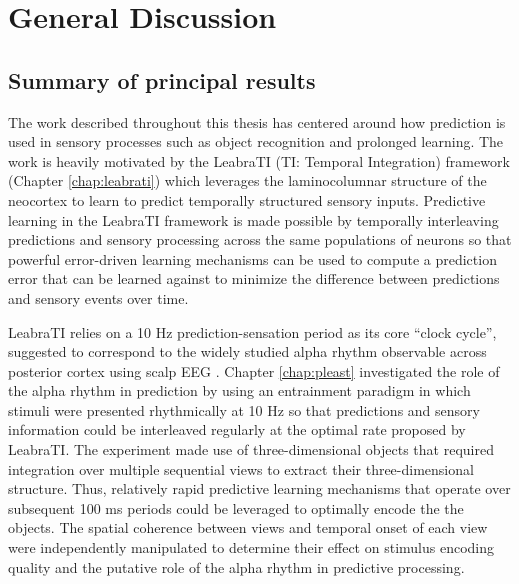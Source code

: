 \documentclass[dwyatte_dissertation.tex]{subfiles}
\begin{document}
\sloppy

\chapter{General Discussion}
\section{Summary of principal results}
The work described throughout this thesis has centered around how prediction is used in sensory processes such as object recognition and prolonged learning. The work is heavily motivated by the LeabraTI (TI: Temporal Integration) framework (Chapter \ref{chap:leabrati}) which leverages the laminocolumnar structure of the neocortex \cite{Mountcastle97,BuxhoevedenCasanova02,HortonAdams05} to learn to predict temporally structured sensory inputs. Predictive learning in the LeabraTI framework is made possible by temporally interleaving predictions and sensory processing across the same populations of neurons so that powerful error-driven learning mechanisms \cite{OReillyMunakata00,OReillyMunakataFrankEtAl12} can be used to compute a prediction error that can be learned against to minimize the difference between predictions and sensory events over time.

LeabraTI relies on a 10 Hz prediction-sensation period as its core ``clock cycle'', suggested to correspond to the widely studied alpha rhythm observable across posterior cortex using scalp EEG \cite{PalvaPalva07,HanslmayrGrossKlimeschEtAl11,VanRullenBuschDrewesEtAl11}. Chapter \ref{chap:pleast} investigated the role of the alpha rhythm in prediction by using an entrainment paradigm \cite{SchroederLakatosKajikawaEtAl08,CalderoneLakatosButlerEtAlInPress} in which stimuli were presented rhythmically at 10 Hz so that predictions and sensory information could be interleaved regularly at the optimal rate proposed by LeabraTI. The experiment made use of three-dimensional objects that required integration over multiple sequential views to extract their three-dimensional structure. Thus, relatively rapid predictive learning mechanisms that operate over subsequent 100 ms periods could be leveraged to optimally encode the the objects. The spatial coherence between views and temporal onset of each view were independently manipulated to determine their effect on stimulus encoding quality and the putative role of the alpha rhythm in predictive processing.
\end{document}
